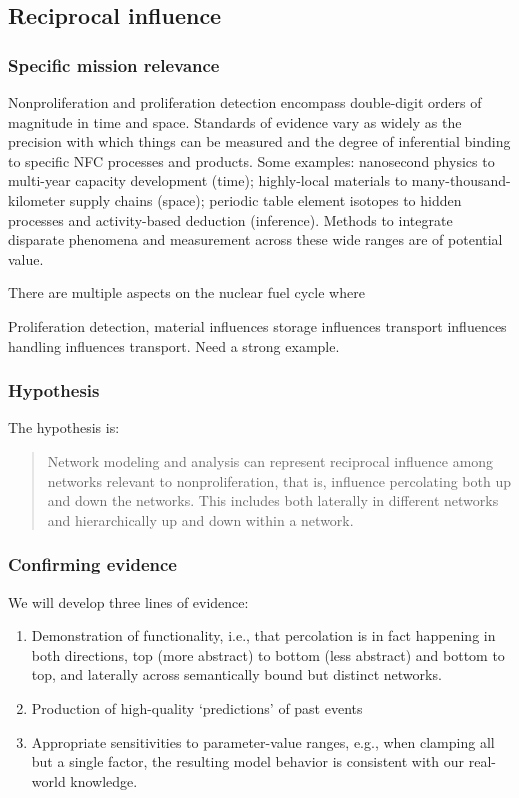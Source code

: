 \documentclass{article} %
\begin{document}
\pagebreak
\subsection{Reciprocal influence}
\subsubsection{Specific mission relevance}

Nonproliferation and proliferation detection encompass double-digit orders of magnitude in time and space. Standards of evidence vary as widely as the precision with which things can be measured and the degree of inferential binding to specific NFC processes and products. Some examples: nanosecond physics to multi-year capacity development (time); highly-local materials to many-thousand-kilometer supply chains (space); periodic table element isotopes to hidden processes and activity-based deduction (inference). Methods to integrate disparate phenomena and measurement across these wide ranges are of potential value. 

There are multiple aspects on the nuclear fuel cycle where 

Proliferation detection, material influences storage influences transport influences handling influences transport. Need a strong example. 

\subsubsection{Hypothesis}
The hypothesis is:
\begin{quote}
Network modeling and analysis can represent reciprocal influence among networks relevant to nonproliferation, that is, influence percolating both up and down the networks. This includes both laterally in different networks and hierarchically up and down within a network.
\end{quote}

\subsubsection{Confirming evidence}
We will develop three lines of evidence:
\begin{enumerate}
\item Demonstration of functionality, i.e., that percolation is in fact happening in both directions, top (more abstract) to bottom (less abstract) and bottom to top, and laterally across semantically bound but distinct networks.
\item Production of high-quality `predictions' of past events
\item Appropriate sensitivities to parameter-value ranges, e.g., when clamping all but a single factor, the resulting model behavior is consistent with our real-world knowledge.
\end{enumerate}
\end{document}
